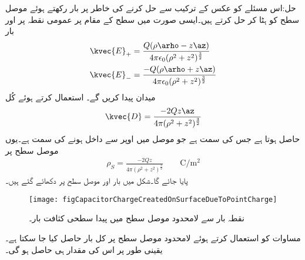 حل:اس مسئلے کو عکس کے ترکیب سے حل کرنے کی خاطر  پر  بار رکھتے ہوئے موصل سطح کو ہٹا کر حل کرتے ہیں۔ایسی صورت میں سطح کے مقام پر عمومی نقطہ  پر  اور  بار
\begin{align*}
\kvec{E}_+&=\frac{Q (\rho \arho-z\az)}{4\pi \epsilon_0 (\rho^2+z^2)^{\frac{3}{2}}}\\
\kvec{E}_-&=\frac{-Q (\rho \arho+z\az)}{4\pi \epsilon_0 (\rho^2+z^2)^{\frac{3}{2}}}
\end{align*}
میدان پیدا کریں گے۔ استعمال کرتے ہوئے  کُل 
\begin{align*}
\kvec{D}=\frac{-2Qz\az}{4\pi (\rho^2+z^2)^{\frac{3}{2}}}
\end{align*}  
حاصل ہوتا ہے جس کی سمت  ہے جو موصل میں اوپر سے داخل ہونے کی سمت ہے۔یوں موصل سطح پر
\begin{align}\label{مساوات_کپیسٹر_لامحدود_سطح_پر_سطحی_کثافت}
\rho_S=\frac{-2Qz}{4\pi  (\rho^2+z^2)^{\frac{3}{2}}} \quad \quad \si{\coulomb \per \meter \squared}
\end{align}
پایا جائے گا۔شکل  میں بار  اور موصل سطح پر  دکھائے گئے ہیں۔
\begin{figure}
\centering
\texttt{[image: figCapacitorChargeCreatedOnSurfaceDueToPointCharge]}
\caption{نقطہ بار سے لامحدود موصل سطح میں پیدا سطحی کثافت  بار۔}
\label{شکل_کپیسٹر_لامحدود_سطح_پیدا-کثافت_بار}
\end{figure}

مساوات  کو استعمال کرتے ہوئے  لامحدود موصل سطح پر کل بار حاصل کیا جا سکتا ہے۔یقینی طور پر اس کی مقدار  ہی حاصل ہو گی۔

